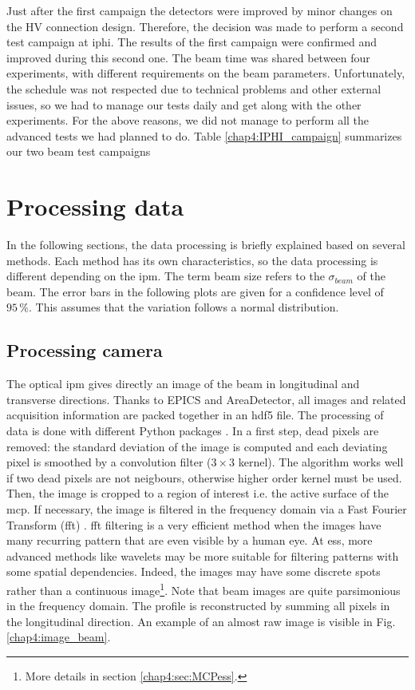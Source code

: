 \begin{refsection}
  Just after the first campaign the detectors were improved by minor changes on the HV connection design. Therefore, the decision was made to perform a second test campaign at \acrshort{iphi}.
  The results of the first campaign were confirmed and improved during this second one.
  The beam time was shared between four experiments, with different requirements on the beam parameters.
  Unfortunately, the schedule was not respected due to technical problems and other external issues, so
  we had to manage our tests daily and get along with the other experiments.
  For the above reasons, we did not manage to perform all the advanced tests we had planned to do.
  Table \ref{chap4:IPHI_campaign} summarizes our two beam test campaigns

  


  \section{Processing data}
  In the following sections, the data processing is briefly explained based on several methods. Each method has its own characteristics, so the data processing is different depending on the \acrshort{ipm}. The term beam size refers to the $\sigma_{beam}$ of the beam. The error bars in the following plots are given for a confidence level of $95\,\mathrm{\%}$. This assumes that the variation follows a normal distribution.

  \subsection{Processing camera}

  The optical \acrshort{ipm} gives directly an image of the beam in longitudinal and transverse directions. Thanks to EPICS and AreaDetector, all images and related acquisition information are packed together in an \acrshort{hdf}5 file. The processing of data is done with different Python packages \cite{NumPy2011,SciPy2019,Hunter2007}. In a first step, dead pixels are removed: the standard deviation of the image is computed and each deviating pixel is smoothed by a convolution filter ($3\times3$ kernel). The algorithm works well if two dead pixels are not neigbours, otherwise higher order kernel must be used. Then, the image is cropped to a region of interest i.e. the active surface of the \acrshort{mcp}. If necessary, the image is filtered in the frequency domain via a Fast Fourier Transform (\acrshort{fft}) \cite{Burrus2012}. \acrshort{fft} filtering is a very efficient method when the images have many recurring pattern that are even visible by a human eye. At \acrshort{ess}, more advanced methods like wavelets \cite{Burrus1997,bultheel2014} may be more suitable for filtering patterns with some spatial dependencies. Indeed, the images may have some discrete spots rather than a continuous image\footnote{More details in section \ref{chap4:sec:MCPess}.}. Note that beam images are quite parsimonious in the frequency domain. The profile is reconstructed by summing all pixels in the longitudinal direction. An example of an almost raw image is visible in Fig. \ref{chap4:image_beam}.


\end{refsection}
